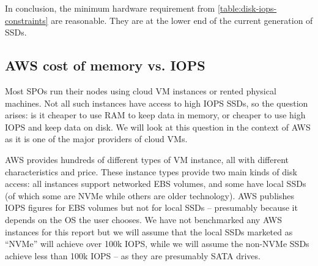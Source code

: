 \documentclass[11pt,a4paper]{article}
\begin{document}
In conclusion, the minimum hardware requirement from
\cref{table:disk-iops-constraints} are reasonable. They are at the lower end
of the current generation of SSDs.


\subsection{AWS cost of memory vs. IOPS}

Most SPOs run their nodes using cloud VM instances or rented physical machines.
Not all such instances have access to high IOPS SSDs, so the question arises:
is it cheaper to use RAM to keep data in memory, or cheaper to use high IOPS
and keep data on disk. We will look at this question in the context of AWS
as it is one of the major providers of cloud VMs.

AWS provides hundreds of different types of VM instance, all with different
characteristics and price. These instance types provide two main kinds of disk
access: all instances support networked EBS volumes, and some have local SSDs
(of which some are NVMe while others are older technology). AWS publishes IOPS
figures for EBS volumes but not for local SSDs -- presumably because it depends
on the OS the user chooses. We have not benchmarked any AWS instances for this
report but we will assume that the local SSDs marketed as ``NVMe'' will achieve
over 100k IOPS, while we will assume the non-NVMe SSDs achieve less than 100k
IOPS -- as they are presumably SATA drives.
\end{document}
